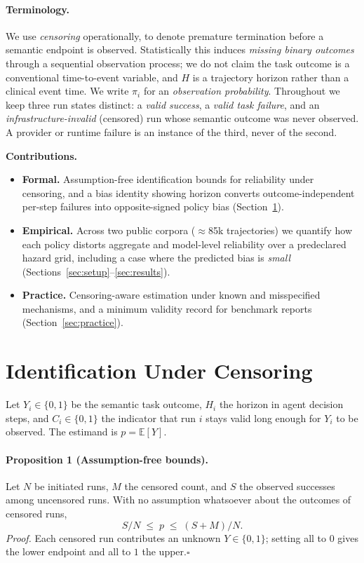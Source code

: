 \documentclass[letterpaper]{article}
\begin{document}
\paragraph{Terminology.} We use \emph{censoring} operationally, to denote
premature termination before a semantic endpoint is observed. Statistically this
induces \emph{missing binary outcomes} through a sequential observation process;
we do not claim the task outcome is a conventional time-to-event variable, and
$H$ is a trajectory horizon rather than a clinical event time. We write
$\pi_i$ for an \emph{observation probability}. Throughout we keep three run
states distinct: a \emph{valid success}, a \emph{valid task failure}, and an
\emph{infrastructure-invalid} (censored) run whose semantic outcome was never
observed. A provider or runtime failure is an instance of the third, never of
the second.

\vspace{2pt}
\noindent\textbf{Contributions.}
\begin{itemize}\itemsep1pt \parskip0pt 
\item \textbf{Formal.} Assumption-free identification bounds for reliability
under censoring, and a bias identity showing horizon converts
outcome-independent per-step failures into opposite-signed policy bias
(Section~\ref{sec:model}).
\item \textbf{Empirical.} Across two public corpora ($\approx$85k trajectories)
we quantify how each policy distorts aggregate and model-level reliability over
a predeclared hazard grid, including a case where the predicted bias is
\emph{small} (Sections~\ref{sec:setup}--\ref{sec:results}).
\item \textbf{Practice.} Censoring-aware estimation under known and
misspecified mechanisms, and a minimum validity record for benchmark reports
(Section~\ref{sec:practice}).
\end{itemize}

\section{Identification Under Censoring}
\label{sec:model}

Let $Y_i\in\{0,1\}$ be the semantic task outcome, $H_i$ the horizon in agent
decision steps, and $C_i\in\{0,1\}$ the indicator that run $i$ stays valid long
enough for $Y_i$ to be observed. The estimand is $p=\mathbb{E}[Y]$.

\paragraph{Proposition 1 (Assumption-free bounds).}
Let $N$ be initiated runs, $M$ the censored count, and $S$ the observed
successes among uncensored runs. With no assumption whatsoever about the
outcomes of censored runs,
\begin{equation}
S/N \;\le\; p \;\le\; (S+M)/N .
\label{eq:bounds}
\end{equation}
\emph{Proof.} Each censored run contributes an unknown $Y\in\{0,1\}$; setting
all to $0$ gives the lower endpoint and all to $1$ the upper.\hfill$\square$
\end{document}
